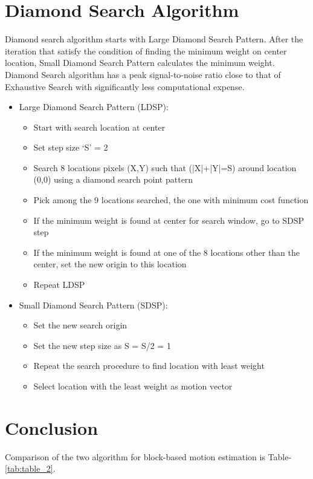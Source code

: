 \documentclass[]{article}
\begin{document}
\section{Diamond Search Algorithm}	
	\justifying Diamond search algorithm starts with Large Diamond Search Pattern. After the iteration that satisfy the condition of finding the minimum weight on center location,  Small Diamond Search Pattern calculates the minimum weight. Diamond Search algorithm has a peak signal-to-noise ratio close to that of Exhaustive Search with significantly less computational expense.\cite{wiki_block_based}
	\begin{itemize}
	\item Large Diamond Search Pattern (LDSP):
		\begin{itemize}
			\item Start with search location at center
			\item Set step size ‘S’ = 2
			\item Search 8 locations pixels (X,Y) such that (|X|+|Y|=S) around location (0,0) using a diamond search point pattern
			\item Pick among the 9 locations searched, the one with minimum cost function
			\item If the minimum weight is found at center for search window, go to SDSP step
			\item If the minimum weight is found at one of the 8 locations other than the center, set the new origin to this location
			\item Repeat LDSP
		\end{itemize}
	\item Small Diamond Search Pattern (SDSP):
			\begin{itemize}
				\item Set the new search origin
				\item Set the new step size as S = S/2 = 1
				\item Repeat the search procedure to find location with least weight
				\item Select location with the least weight as motion vector
			\end{itemize}
	\end{itemize}
\section{Conclusion}
	\justifying Comparison of the two algorithm for block-based motion estimation is Table- \ref{tab:table_2}.	
\end{document}
